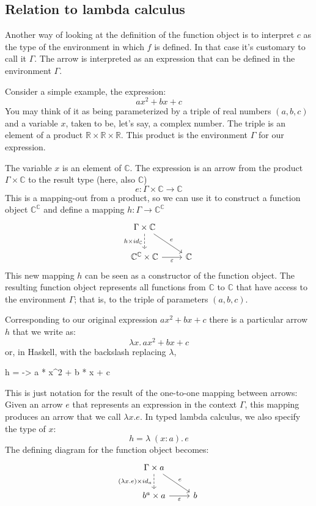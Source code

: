 \documentclass[DaoFP]{subfiles}
\begin{document}
\subsection{Relation to lambda calculus}

Another way of looking at the definition of the function object is to interpret $c$ as the type of the environment in which $f$ is defined. In that case it's customary to call it $\Gamma$. The arrow is interpreted as an expression that can be defined in the environment $\Gamma$. 

Consider a simple example, the expression:
\[a x^2 + b x + c\]
You may think of it as being parameterized by a triple of real numbers $(a, b, c)$ and a variable $x$, taken to be, let's say, a complex number. The triple is an element of a product $\mathbb{R} \times \mathbb{R} \times \mathbb{R}$. This product is the environment $\Gamma$ for our expression. 

The variable $x$ is an element of $\mathbb{C}$. The expression is an arrow from the product $\Gamma \times \mathbb{C}$ to the result type (here, also $\mathbb{C}$)
\[e \colon \Gamma \times \mathbb{C} \to \mathbb{C} \]
This is a mapping-out from a product, so we can use it to construct a function object  $\mathbb{C}^{\mathbb{C}}$ and define a mapping $h \colon \Gamma \to \mathbb{C}^{\mathbb{C}}$
\[
 \begin{tikzcd}
 \Gamma \times \mathbb{C}
 \arrow[d, dashed, "h \times id_{\mathbb{C}}"']
 \arrow[rd, "e"]
 \\
 \mathbb{C}^{\mathbb{C}} \times \mathbb{C}
 \arrow[r, "\varepsilon"']
& \mathbb{C}
 \end{tikzcd}
\]
This new mapping $h$ can be seen as a constructor of the function object. The resulting function object represents all functions from $\mathbb{C}$ to $\mathbb{C}$ that have access to the environment $\Gamma$; that is, to the triple of parameters $(a, b, c)$. 

Corresponding to our original expression $a x^2 + b x + c$ there is a particular arrow $h$ that we write as:
\[ \lambda x . \,a x^2 + b x + c \]
or, in Haskell, with the backslash replacing $\lambda$,
\begin{haskell}
h = \x -> a * x^2 + b * x + c
\end{haskell}

This is just notation for the result of the one-to-one mapping between arrows: Given an arrow $e$ that represents an expression in the context $\Gamma$, this mapping produces an arrow that we call $\lambda x . e$. In typed lambda calculus, we also specify the type of $x$:
\[h = \lambda\;  (x \colon a) . \, e\]
The defining diagram for the function object becomes:
\[
 \begin{tikzcd}
 \Gamma \times a
 \arrow[d, dashed, "{(\lambda x  . e) \times id_a}"']
 \arrow[rd, "e"]
 \\
 b^a \times a
 \arrow[r, "\varepsilon"']
& b
 \end{tikzcd}
\]
\end{document}

